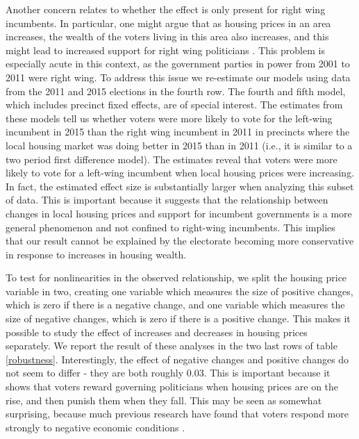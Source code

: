 \documentclass[12pt,a4paper]{article}
\begin{document}
	Another concern relates to whether the effect is only present for right wing incumbents. In particular, one might argue that as housing prices in an area increases, the wealth of the voters living in this area also increases, and this might lead to increased support for right wing politicians \cite{ansell2014political}. This problem is especially acute in this context, as the government parties in power from 2001 to 2011 were right wing. To address this issue we re-estimate our models using data from the 2011 and 2015 elections in the fourth row. The fourth and fifth model, which includes precinct fixed effects, are of special interest. The estimates from these models tell us whether voters were more likely to vote for the left-wing incumbent in 2015 than the right wing incumbent in 2011 in precincts where the local housing market was doing better in 2015 than in 2011 (i.e., it is similar to a two period first difference model). The estimates reveal that voters were more likely to vote for a left-wing incumbent when local housing prices were increasing. In fact, the estimated effect size is substantially larger when analyzing this subset of data. This is important because it suggests that the relationship between changes in local housing prices and support for incumbent governments is a more general phenomenon and not confined to right-wing incumbents. This implies that our result cannot be explained by the electorate becoming more conservative in response to increases in housing wealth.
	
	To test for nonlinearities in the observed relationship, we split the housing price variable in two, creating one variable which measures the size of positive changes, which is zero if there is a negative change, and one variable which measures the size of negative changes, which is zero if there is a positive change. This makes it possible to study the effect of increases and decreases in housing prices separately. We report the result of these analyses in the two last rows of table \ref{robustness}. Interestingly, the effect of negative changes and positive changes do not seem to differ - they are both roughly 0.03. This is important because it shows that voters reward governing politicians when housing prices are on the rise, and then punish them when they fall. This may be seen as somewhat surprising, because much previous research have found that voters respond more strongly to negative economic conditions \citep[e.g.][]{bloom1975voter,headrick1991attention,soroka2014negativity}.
	
\end{document}
